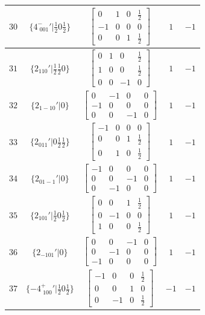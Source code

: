 \documentclass[fleqn,8pt]{jsarticle}
\begin{document}
\begin{longtable}{ccccc}
$ 30 $ & $ \{4^{-}_{\,\,001}{}'|\frac{1}{2} 0 \frac{1}{2}\} $ & $ \begin{bmatrix} 0 & 1 & 0 & \frac{1}{2} \\ -1 & 0 & 0 & 0 \\ 0 & 0 & 1 & \frac{1}{2} \end{bmatrix} $ & $ 1 $ & $ -1 $ \\ \hline
$ 31 $ & $ \{2{}_{110}{}'|\frac{1}{2} \frac{1}{2} 0\} $ & $ \begin{bmatrix} 0 & 1 & 0 & \frac{1}{2} \\ 1 & 0 & 0 & \frac{1}{2} \\ 0 & 0 & -1 & 0 \end{bmatrix} $ & $ 1 $ & $ -1 $ \\ \hline
$ 32 $ & $ \{2{}_{1-10}{}'|0\} $ & $ \begin{bmatrix} 0 & -1 & 0 & 0 \\ -1 & 0 & 0 & 0 \\ 0 & 0 & -1 & 0 \end{bmatrix} $ & $ 1 $ & $ -1 $ \\ \hline
$ 33 $ & $ \{2{}_{011}{}'|0 \frac{1}{2} \frac{1}{2}\} $ & $ \begin{bmatrix} -1 & 0 & 0 & 0 \\ 0 & 0 & 1 & \frac{1}{2} \\ 0 & 1 & 0 & \frac{1}{2} \end{bmatrix} $ & $ 1 $ & $ -1 $ \\ \hline
$ 34 $ & $ \{2{}_{01-1}{}'|0\} $ & $ \begin{bmatrix} -1 & 0 & 0 & 0 \\ 0 & 0 & -1 & 0 \\ 0 & -1 & 0 & 0 \end{bmatrix} $ & $ 1 $ & $ -1 $ \\ \hline
$ 35 $ & $ \{2{}_{101}{}'|\frac{1}{2} 0 \frac{1}{2}\} $ & $ \begin{bmatrix} 0 & 0 & 1 & \frac{1}{2} \\ 0 & -1 & 0 & 0 \\ 1 & 0 & 0 & \frac{1}{2} \end{bmatrix} $ & $ 1 $ & $ -1 $ \\ \hline
$ 36 $ & $ \{2{}_{-101}{}'|0\} $ & $ \begin{bmatrix} 0 & 0 & -1 & 0 \\ 0 & -1 & 0 & 0 \\ -1 & 0 & 0 & 0 \end{bmatrix} $ & $ 1 $ & $ -1 $ \\ \hline
$ 37 $ & $ \{-4^{+}_{\,\,100}{}'|\frac{1}{2} 0 \frac{1}{2}\} $ & $ \begin{bmatrix} -1 & 0 & 0 & \frac{1}{2} \\ 0 & 0 & 1 & 0 \\ 0 & -1 & 0 & \frac{1}{2} \end{bmatrix} $ & $ -1 $ & $ -1 $ \\ \hline

\end{longtable}
\end{document}
